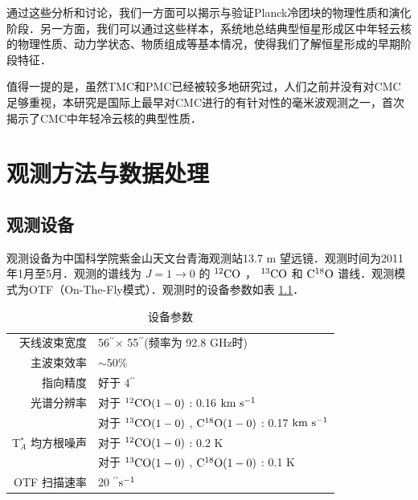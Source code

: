 \documentclass[UTF8, nocolorlinks]{pkuthss}
\newcommand{\coa}{$\rm ^{12}CO$ }
\newcommand{\cob}{$\rm ^{13}CO$ }
\newcommand{\coc}{$\rm C^{18}O$ }
\newcommand{\coaa}{$\rm^{12}CO(1-0)$ }
\newcommand{\cobb}{$\rm^{13}CO(1-0)$ }
\newcommand{\cocc}{$\rm C^{18}O(1-0)$ }
\newcommand{\kms}{$\rm km\ s^{-1}$}
\newcommand{\arcsec}{$^{\prime\prime}$}
\begin{document}
		通过这些分析和讨论，我们一方面可以揭示与验证Planck冷团块的物理性质和演化阶段．另一方面，我们可以通过这些样本，系统地总结典型恒星形成区中年轻云核的物理性质、动力学状态、物质组成等基本情况，使得我们了解恒星形成的早期阶段特征．

		值得一提的是，虽然TMC和PMC已经被较多地研究过，人们之前并没有对CMC足够重视，本研究是国际上最早对CMC进行的有针对性的毫米波观测之一，首次揭示了CMC中年轻冷云核的典型性质．

\chapter{观测方法与数据处理}

	\section{观测设备}
		观测设备为中国科学院紫金山天文台青海观测站13.7 m 望远镜．观测时间为2011年1月至5月．观测的谱线为 $J=1 \rightarrow 0 $ 的  \coa， \cob 和 \coc 谱线．观测模式为OTF（On-The-Fly模式）．观测时的设备参数如表 \ref{Fig.Observation}．

		\begin{table}[H]
	        \begin{center}
	        \caption{设备参数\label{Fig.Observation}}
	        \setlength{\tabcolsep}{0.1in}
	        \vspace{0.5em}
	        \begin{tabular}{rl}
	        \toprule
	        \hline
	        天线波束宽度              & 56\arcsec$\times$ 55\arcsec (频率为 92.8 GHz时) \\
	        主波束效率                & $\sim$50\%                               \\
	        指向精度                & 好于 4\arcsec                     \\
	        光谱分辨率               & 对于 \coaa: 0.16 \kms                     \\
	                                & 对于 \cobb, \cocc:  0.17 \kms           \\
	        T$^*_A$ 均方根噪声       & 对于 \coaa: 0.2 K                         \\
	                                & 对于 \cobb, \cocc: 0.1 K               \\
	        OTF 扫描速率            & 20 \arcsec $\rm s^{-1}$\\
	        \hline
	        \bottomrule
	        \end{tabular}
	        \end{center}
        \end{table}
\end{document}
